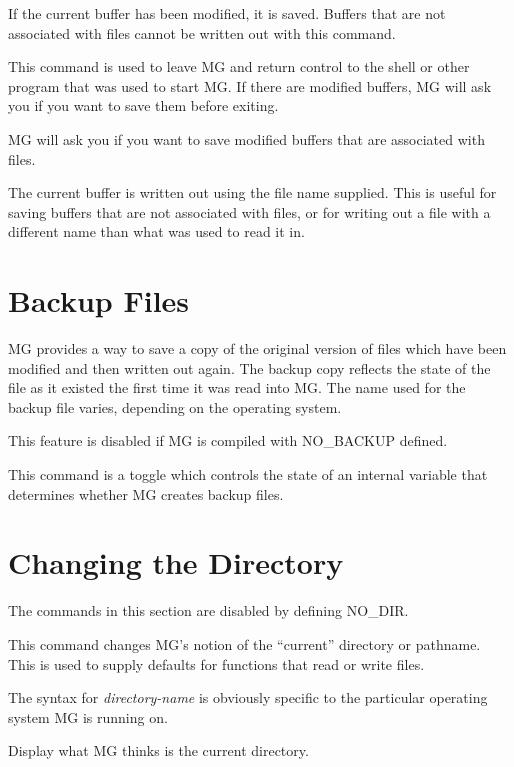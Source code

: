 \fbody If the current buffer has been modified, it is saved.  Buffers
that are not associated with files cannot be written out with this
command.

\fbody This command is used to leave MG and return control to the shell
or other program that was used to start MG.  If there are modified buffers,
MG will ask you if you want to save them before exiting.

\fbody MG will ask you if you want to save modified buffers that are
associated with files.

\fbody The current buffer is written out using the file name supplied.
This is useful for saving buffers that are not associated with files, or
for writing out a file with a different name than what was used to read
it in.

\section{Backup Files}

MG provides a way to save a copy of the original version of files which 
have been modified and then written out again.  The backup copy reflects
the state of the file as it existed the first time it was read into MG.
The name used for the backup file varies, depending on the operating
system.

This feature is disabled if MG is compiled with NO\_BACKUP defined.

\fbody This command is a toggle which
controls the state of an internal variable that determines whether MG
creates backup files. 

\section{Changing the Directory}

The commands in this section are disabled by defining NO\_DIR.

\fbody This command changes MG's notion of the ``current'' directory
or pathname.  This is used to supply defaults for functions that read 
or write files.

The syntax for {\em directory-name\/} is obviously specific to the
particular operating system MG is running on.

\fbody Display what MG thinks is the current directory.

